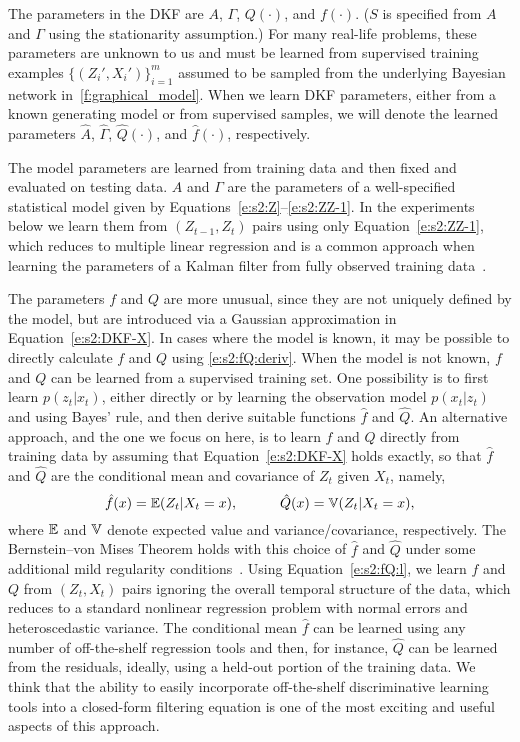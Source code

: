 The parameters in the DKF are $A$, $\Gamma$, $Q(\cdot)$, and $f(\cdot)$. ($S$ is specified from $A$ and $\Gamma$ using the stationarity assumption.)  For many real-life problems, these parameters are unknown to us and must be learned from supervised training examples $\{(Z_i',X_i')\}_{i=1}^m$ assumed to be sampled from the underlying Bayesian network in~\eqref{f:graphical_model}.  When we learn DKF parameters, either from a known generating model or from supervised samples, we will denote the learned parameters $\hat A$, $\hat \Gamma$, $\hat Q(\cdot)$, and $\hat f(\cdot)$, respectively.

The model parameters are learned from training data and then fixed and evaluated on testing data. $A$ and $\Gamma$ are the parameters of a well-specified statistical model given by Equations~\ref{e:s2:Z}--\ref{e:s2:ZZ-1}. In the experiments below we learn them from $(Z_{t-1},Z_t)$ pairs using only Equation~\ref{e:s2:ZZ-1}, which reduces to multiple linear regression and is a common approach when learning the parameters of a Kalman filter from fully observed training data~\cite[see, for example,][]{Wu02}. 

The parameters $f$ and $Q$ are more unusual, since they are not uniquely defined by the model, but are introduced via a Gaussian approximation in Equation~\ref{e:s2:DKF-X}.  In cases where the model is known, it may be possible to directly calculate $f$ and $Q$ using \eqref{e:s2:fQ:deriv}.  When the model is not known, $f$ and $Q$ can be learned from a supervised training set.  One possibility is to first learn $p(z_t|x_t)$, either directly or by learning the observation model $p(x_t|z_t)$ and using Bayes' rule, and then derive suitable functions $\hat f$ and $\hat Q$. An alternative approach, and the one we focus on here, is to learn $f$ and $Q$ directly from training data by assuming that Equation~\ref{e:s2:DKF-X} holds exactly, so that $\hat f$ and $\hat Q$ are the conditional mean and covariance of $Z_t$ given $X_t$, namely,
\begin{equation} \label{e:s2:fQ:l} \hat f(x)=\operatorname{\mathbb{E}}(Z_t|X_t=x), \quad \quad \quad \hat Q(x)=\operatorname{\mathbb{V}}(Z_t|X_t=x) , \end{equation}
where $\operatorname{\mathbb{E}}$ and $\operatorname{\mathbb{V}}$ denote expected value and variance/covariance, respectively. The Bernstein--von Mises Theorem holds with this choice of $\hat f$ and $\hat Q$ under some additional mild regularity conditions~\cite{vdV98}. Using Equation~\ref{e:s2:fQ:l}, we learn $f$ and $Q$ from $(Z_t,X_t)$ pairs ignoring the overall temporal structure of the data, which reduces to a standard nonlinear regression problem with normal errors and heteroscedastic variance. The conditional mean $\hat f$ can be learned using any number of off-the-shelf regression tools and then, for instance, $\hat Q$ can be learned from the residuals, ideally, using a held-out portion of the training data. We think that the ability to easily incorporate off-the-shelf discriminative learning tools into a closed-form filtering equation is one of the most exciting and useful aspects of this approach.

